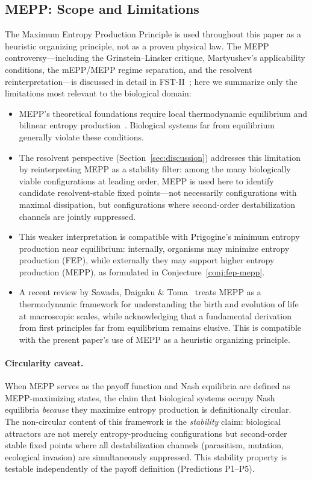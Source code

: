 \documentclass[12pt,a4paper]{article}
\theoremstyle{remark}
\begin{document}
\subsection{MEPP: Scope and Limitations}

The Maximum Entropy Production Principle is used throughout this paper as a heuristic organizing principle, not as a proven physical law. The MEPP controversy---including the Grinstein--Linsker critique, Martyushev's applicability conditions, the mEPP/MEPP regime separation, and the resolvent reinterpretation---is discussed in detail in FST-II~\citep{FSTII}; here we summarize only the limitations most relevant to the biological domain:
\begin{itemize}
\item MEPP's theoretical foundations require local thermodynamic equilibrium and bilinear entropy production~\citep{Martyushev2010}. Biological systems far from equilibrium generally violate these conditions.
\item The resolvent perspective (Section~\ref{sec:discussion}) addresses this limitation by reinterpreting MEPP as a stability filter: among the many biologically viable configurations at leading order, MEPP is used here to identify candidate resolvent-stable fixed points---not necessarily configurations with maximal dissipation, but configurations where second-order destabilization channels are jointly suppressed.
\item This weaker interpretation is compatible with Prigogine's minimum entropy production near equilibrium: internally, organisms may minimize entropy production (FEP), while externally they may support higher entropy production (MEPP), as formulated in Conjecture~\ref{conj:fep-mepp}.
\item A recent review by Sawada, Daigaku \& Toma~\citep{Toma2025} treats MEPP as a thermodynamic framework for understanding the birth and evolution of life at macroscopic scales, while acknowledging that a fundamental derivation from first principles far from equilibrium remains elusive. This is compatible with the present paper's use of MEPP as a heuristic organizing principle.
\end{itemize}

\paragraph{Circularity caveat.} When MEPP serves as the payoff function and Nash equilibria are defined as MEPP-maximizing states, the claim that biological systems occupy Nash equilibria \emph{because} they maximize entropy production is definitionally circular. The non-circular content of this framework is the \emph{stability} claim: biological attractors are not merely entropy-producing configurations but second-order stable fixed points where all destabilization channels (parasitism, mutation, ecological invasion) are simultaneously suppressed. This stability property is testable independently of the payoff definition (Predictions P1--P5).
\end{document}
